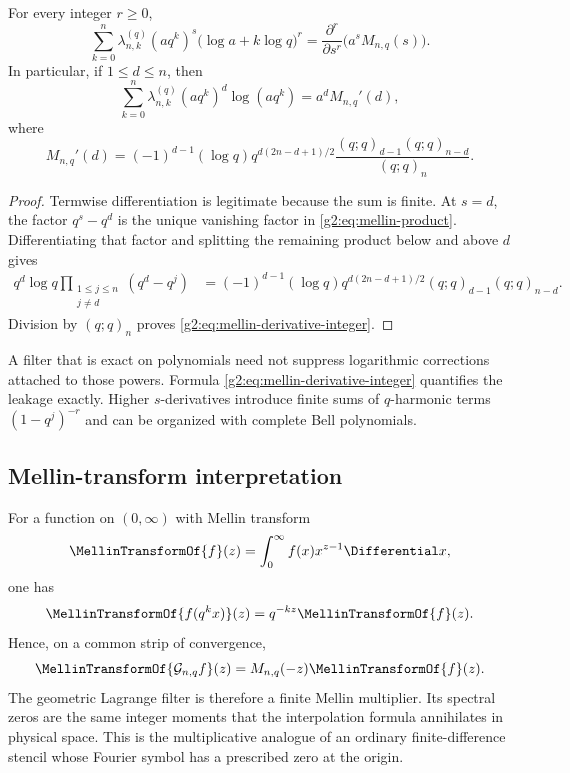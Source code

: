 \begin{proposition}
\label{g2:prop:log-powers}
For every integer $r\ge0$,
\begin{equation}
 \sum_{k=0}^n\lambda_{n,k}^{(q)}(aq^k)^s
 \bigl(\log a+k\log q\bigr)^r
 =\frac{\partial^r}{\partial s^r}\bigl(a^sM_{n,q}(s)\bigr).
 \label{g2:eq:log-power-response}
\end{equation}
In particular, if $1\le d\le n$, then
\begin{equation}
 \sum_{k=0}^n\lambda_{n,k}^{(q)}(aq^k)^d\log(aq^k)
 =a^dM_{n,q}'(d),
 \label{g2:eq:first-log-response}
\end{equation}
where
\begin{equation}
 M_{n,q}'(d)
 =(-1)^{d-1}(\log q)
 q^{d(2n-d+1)/2}
 \frac{(q;q)_{d-1}(q;q)_{n-d}}{(q;q)_n}.
 \label{g2:eq:mellin-derivative-integer}
\end{equation}
\end{proposition}

\begin{proof}
Termwise differentiation is legitimate because the sum is finite.  At
$s=d$, the factor $q^s-q^d$ is the unique vanishing factor in
\eqref{g2:eq:mellin-product}.  Differentiating that factor and splitting the
remaining product below and above $d$ gives
\begin{align*}
 q^d\log q\prod_{\substack{1\le j\le n\\j\ne d}}(q^d-q^j)
 &=(-1)^{d-1}(\log q)
 q^{d(2n-d+1)/2}(q;q)_{d-1}(q;q)_{n-d}.
\end{align*}
Division by $(q;q)_n$ proves \eqref{g2:eq:mellin-derivative-integer}.
\end{proof}

\begin{remark}
A filter that is exact on polynomials need not suppress logarithmic
corrections attached to those powers.  Formula
\eqref{g2:eq:mellin-derivative-integer} quantifies the leakage exactly.  Higher
$s$-derivatives introduce finite sums of $q$-harmonic terms
$(1-q^j)^{-r}$ and can be organized with complete Bell polynomials.
\end{remark}

\subsection{Mellin-transform interpretation}

For a function on $(0,\infty)$ with Mellin transform
\[
 \MellinTransformOf{f}(z)=\int_0^\infty f(x)x^{z-1}\Differential x,
\]
one has
\[
 \MellinTransformOf{f(q^kx)}(z)=q^{-kz}\MellinTransformOf{f}(z).
\]
Hence, on a common strip of convergence,
\begin{equation}
 \MellinTransformOf{\Gop_{n,q}f}(z)=M_{n,q}(-z)\MellinTransformOf{f}(z).
 \label{g2:eq:mellin-transform-multiplier}
\end{equation}
The geometric Lagrange filter is therefore a finite Mellin multiplier.  Its
spectral zeros are the same integer moments that the interpolation formula
annihilates in physical space.  This is the multiplicative analogue of an
ordinary finite-difference stencil whose Fourier symbol has a prescribed zero
at the origin.


